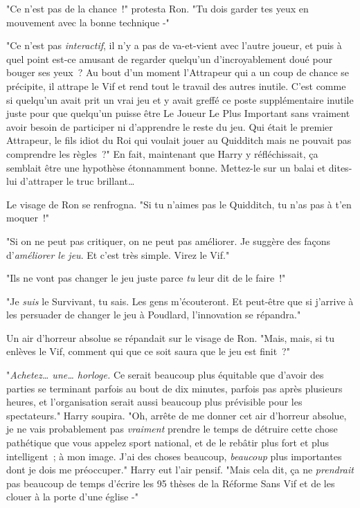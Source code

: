 "Ce n'est pas de la chance~!" protesta Ron. "Tu dois garder tes yeux en mouvement avec la bonne technique -"

"Ce n'est pas \emph{interactif}, il n'y a pas de va-et-vient avec l'autre joueur, et puis à quel point est-ce amusant de regarder quelqu'un d'incroyablement doué pour bouger ses yeux~? Au bout d'un moment l'Attrapeur qui a un coup de chance se précipite, il attrape le Vif et rend tout le travail des autres inutile. C'est comme si quelqu'un avait prit un vrai jeu et y avait greffé ce poste supplémentaire inutile juste pour que quelqu'un puisse être Le Joueur Le Plus Important sans vraiment avoir besoin de participer ni d'apprendre le reste du jeu. Qui était le premier Attrapeur, le fils idiot du Roi qui voulait jouer au Quidditch mais ne pouvait pas comprendre les règles~?" En fait, maintenant que Harry y réfléchissait, ça semblait être une hypothèse étonnamment bonne. Mettez-le sur un balai et dites-lui d'attraper le truc brillant…

Le visage de Ron se renfrogna. "Si tu n'aimes pas le Quidditch, tu n'as pas à t'en moquer~!"

"Si on ne peut pas critiquer, on ne peut pas améliorer. Je suggère des façons d'\emph{améliorer le jeu}. Et c'est très simple. Virez le Vif."

"Ils ne vont pas changer le jeu juste parce \emph{tu} leur dit de le faire~!"

"Je \emph{suis} le Survivant, tu sais. Les gens m'écouteront. Et peut-être que si j'arrive à les persuader de changer le jeu à Poudlard, l'innovation se répandra."

Un air d'horreur absolue se répandait sur le visage de Ron. "Mais, mais, si tu enlèves le Vif, comment qui que ce soit saura que le jeu est finit~?"

"\emph{Achetez… une… horloge.} Ce serait beaucoup plus équitable que d'avoir des parties se terminant parfois au bout de dix minutes, parfois pas après plusieurs heures, et l'organisation serait aussi beaucoup plus prévisible pour les spectateurs." Harry soupira. "Oh, arrête de me donner cet air d'horreur absolue, je ne vais probablement pas \emph{vraiment} prendre le temps de détruire cette chose pathétique que vous appelez sport national, et de le rebâtir plus fort et plus intelligent~; à mon image. J'ai des choses beaucoup, \emph{beaucoup} plus importantes dont je dois me préoccuper." Harry eut l'air pensif. "Mais cela dit, ça ne \emph{prendrait} pas beaucoup de temps d'écrire les 95 thèses de la Réforme Sans Vif et de les clouer à la porte d'une église -"

